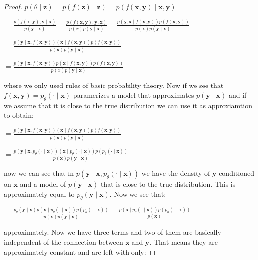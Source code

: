 \begin{proof}
    $p(\theta \mid \mathbf{z}) = p(f(\mathbf{z})\mid \mathbf{z}) = p(f(\mathbf{x}, \mathbf{y})\mid \mathbf{x},\mathbf{y})$


    $= \frac{p(f(\mathbf{x}, \mathbf{y}), \mathbf{y}\mid \mathbf{x})}{p(\mathbf{y}\mid \mathbf{x})} = \frac{p(f(\mathbf{x}, \mathbf{y}), \mathbf{y}, \mathbf{x})}{p(x) p(\mathbf{y}\mid \mathbf{x})} = \frac{p(\mathbf{y}, \mathbf{x}\mid f(\mathbf{x}, \mathbf{y})) p(f(\mathbf{x}, \mathbf{y}))}{p(\mathbf{x}) p(\mathbf{y}\mid \mathbf{x})}$

    $= \frac{p(\mathbf{y}\mid\mathbf{x}, f(\mathbf{x}, \mathbf{y}))(\mathbf{x}\mid f(\mathbf{x}, \mathbf{y})) p(f(\mathbf{x}, \mathbf{y}))}{p(\mathbf{x}) p(\mathbf{y}\mid \mathbf{x})}$

    $= \frac{p(\mathbf{y}\mid\mathbf{x}, f(\mathbf{x}, \mathbf{y}))p(\mathbf{x}\mid f(\mathbf{x}, \mathbf{y})) p(f(\mathbf{x}, \mathbf{y}))}{p(x) p(\mathbf{y}\mid \mathbf{x})}$

    where we only used rules of basic probability theory. Now if we see that $f(\mathbf{x}, \mathbf{y}) = p_{\theta}(\cdot \mid \mathbf{x})$ paramerizes a model that approximates $p(\mathbf{y}\mid\mathbf{x})$ and if we assume that it is close to the true distribution we can use it as approxiamtion to obtain:

    $= \frac{p(\mathbf{y}\mid\mathbf{x}, f(\mathbf{x}, \mathbf{y}))(\mathbf{x}\mid f(\mathbf{x}, \mathbf{y})) p(f(\mathbf{x}, \mathbf{y}))}{p(\mathbf{x}) p(\mathbf{y}\mid \mathbf{x})}$

    $= \frac{p(\mathbf{y}\mid\mathbf{x}, p_{\theta}(\cdot \mid \mathbf{x}))(\mathbf{x}\mid p_{\theta}(\cdot \mid \mathbf{x})) p(p_{\theta}(\cdot \mid \mathbf{x}))}{p(\mathbf{x}) p(\mathbf{y}\mid \mathbf{x})}$

    now we can see that in $p(\mathbf{y}\mid\mathbf{x}, p_{\theta}(\cdot \mid \mathbf{x}))$ we have the density of $\mathbf{y}$ conditioned on $\mathbf{x}$ and a model of $p(\mathbf{y}\mid\mathbf{x})$ that is close to the true distribution. This is approximately equal to $p_{\theta}(\mathbf{y}\mid\mathbf{x})$. Now we see that:

    $= \frac{p_{\theta}(\mathbf{y}\mid\mathbf{x})p(\mathbf{x}\mid p_{\theta}(\cdot \mid \mathbf{x})) p(p_{\theta}(\cdot \mid \mathbf{x}))}{p(\mathbf{x}) p(\mathbf{y}\mid \mathbf{x})}
    = \frac{p(\mathbf{x}\mid p_{\theta}(\cdot \mid \mathbf{x})) p(p_{\theta}(\cdot \mid \mathbf{x}))}{p(\mathbf{x})}$

    approximately. Now we have three terms and two of them are basically independent of the connection between $\mathbf{x}$ and $\mathbf{y}$. That means they are approximately constant and are left with only:


\end{proof}

